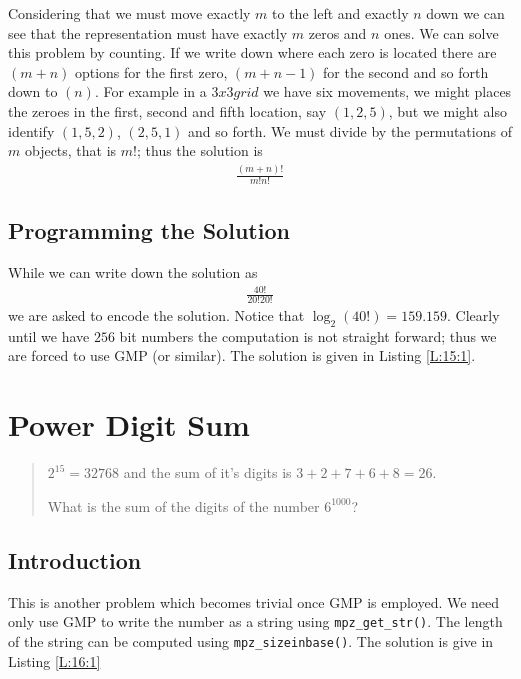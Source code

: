 \documentclass[oneside,12pt]{book}   	%
\newcounter{ex}
\newcounter{pr}
\theoremstyle{definition}
\begin{document}
\begin{spacing}{1.618}
			Considering that we must move exactly $m$ to the left and exactly $n$ down we can see that the representation must have exactly $m$ zeros and $n$ ones. We can solve this problem by counting. If we write down where each zero is located there are $(m+n)$ options for the first zero, $(m+n-1)$ for the second and so forth down to $(n)$. For example in a $3x3 grid$ we have six movements, we might places the zeroes in the first, second and fifth location, say $(1, 2, 5)$, but we might also identify $(1, 5, 2)$, $(2, 5, 1)$ and so forth. We must divide by the permutations of $m$ objects, that is $m!$; thus the solution is 
			\begin{alignat}{4}
				\frac{(m+n)!}{m!n!}
			\end{alignat}
		
		\section{Programming the Solution}
		
			While we can write down the solution as 
			\begin{alignat}{4}
				\frac{40!}{20!20!}
			\end{alignat}
			we are asked to encode the solution. Notice that $\log_2{(40!)}=159.159$. Clearly until we have $256$ bit numbers the computation is not straight forward; thus we are forced to use GMP (or similar). The solution is given in Listing \ref{L:15:1}. 
			
			
			
	\chapter{Power Digit Sum}
		\begin{quote}
			$2^{15}=32768$ and the sum of it's digits is $3+2+7+6+8=26$. 
			
			What is the sum of the digits of the number $6^{1000}$?
		\end{quote}
		\section{Introduction}\label{S:16:1}
		
			This is another problem which becomes trivial once GMP is employed. We need only use GMP to write the number as a string using \texttt{mpz\_get\_str()}. The length of the string can be computed using \texttt{mpz\_sizeinbase()}. The solution is give in Listing \ref{L:16:1}
			

\end{spacing}
\end{document}
